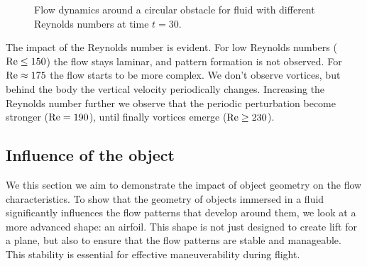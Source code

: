 \begin{figure}[!htb]
    \vspace{-5pt}
    \caption{Flow dynamics around a circular obstacle for fluid with different Reynolds numbers at time $t=30$.}
    \label{fig:influenceRey1}
\end{figure}

The impact of the Reynolds number is evident. For low Reynolds numbers ($\mathrm{Re} \leq 150$) the flow stays laminar, and pattern formation is not observed. For $\mathrm{Re} \approx 175$ the flow starts to be more complex. We don't observe vortices, but behind the body the vertical velocity periodically changes. Increasing the Reynolds number further we observe that the periodic perturbation become stronger ($\mathrm{Re} = 190$), until finally vortices emerge ($\mathrm{Re} \geq 230$).


\subsection{Influence of the object}
We this section we aim to demonstrate the impact of object geometry on the flow characteristics. To show that the geometry of objects immersed in a fluid significantly influences the flow patterns that develop around them, we look at a more advanced shape: an airfoil. This shape is not just designed to create lift for a plane, but also to ensure that the flow patterns are stable and manageable. This stability is essential for effective maneuverability during flight.

